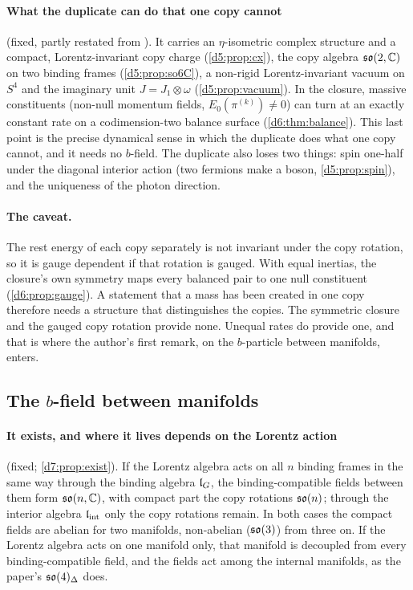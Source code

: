 \paragraph{What the duplicate can do that one copy cannot} (fixed, partly restated from \cite{ES17}). It carries an $\eta$-isometric complex
structure and a compact, Lorentz-invariant copy charge (\cref{d5:prop:cx}), the copy algebra $\mathfrak{so}(2,\mathbb{C})$ on two binding frames
(\cref{d5:prop:so6C}), a non-rigid Lorentz-invariant vacuum on $S^4$ and the imaginary unit $J=J_1\otimes\omega$ (\cref{d5:prop:vacuum}). In
the closure, massive constituents (non-null momentum fields, $E_0(\pi^{(k)})\neq0$) can turn at an exactly constant rate on a codimension-two balance surface (\cref{d6:thm:balance}). This last
point is the precise dynamical sense in which the duplicate does what one copy cannot, and it needs no $b$-field. The duplicate also loses two
things: spin one-half under the diagonal interior action (two fermions make a boson, \cref{d5:prop:spin}), and the uniqueness of the photon
direction.

\paragraph{The caveat.} The rest energy of each copy separately is not invariant under the copy rotation, so it is gauge dependent if that
rotation is gauged. With equal inertias, the closure's own symmetry maps
every balanced pair to one null constituent (\cref{d6:prop:gauge}). A statement that a mass has been created in one copy therefore needs a
structure that distinguishes the copies. The symmetric closure and the gauged copy rotation provide none. Unequal rates do provide one, and
that is where the author's first remark, on the $b$-particle between manifolds, enters.

\subsection{The \texorpdfstring{$b$}{b}-field between manifolds}

\paragraph{It exists, and where it lives depends on the Lorentz action} (fixed; \cref{d7:prop:exist}). If the Lorentz algebra acts on all $n$
binding frames in the same way through the binding algebra $\mathfrak l_G$, the binding-compatible fields between them form $\mathfrak{so}(n,\mathbb{C})$, with compact part the copy rotations $\mathfrak{so}(n)$; through the interior algebra $\mathfrak l_{\rm int}$ only the copy rotations remain. In both cases the compact fields are
abelian for two manifolds, non-abelian ($\mathfrak{so}(3)$) from three on. If the Lorentz algebra acts on one manifold only, that manifold is decoupled
from every binding-compatible field, and the fields act among the internal manifolds, as the paper's $\mathfrak{so}(4)_\Delta$ does.


